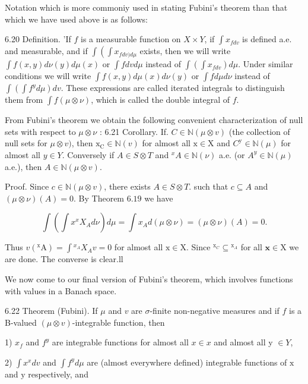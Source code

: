 {{{Notation which is more commoniy used in stating Fubini's theorem than that which we have used above is as follows:

6.20 Definition. 'If $f$ is a measurable function on $X \times Y$, if $\int x_{f d v}$ is defined a.e. and measurable, and if $\int\left(\int x_{f d v) d \mu}\right.$ exists, then we will write $\int f(x, y) d \nu(y) d \mu(x)$ or $\int f d v d \mu$ instead of $\int\left(\int x_{f d v}\right) d \mu$. Under similar conditions we will write $\int f(x, y) d \mu(x) d \nu(y)$ or $\int f d \mu d \nu$ instead of $\int\left(\int f^{y} d \mu\right) d v$. These expressions are called iterated integrals to distinguish them from $\int f(\mu \otimes \nu)$, which is called the double integral of $f$.

From Fubini's theorem we obtain the following convenient characterization of null sets with respect to $\mu \otimes \nu$ : 6.21 Corollary. If. $C \in \mathbb{N}(\mu \otimes v)$ (the collection of null sets for $\mu \otimes v)$, then $\mathrm{x}_{\mathrm{C}} \in \mathbb{N}(v)$ for almost all $\mathrm{x} \in \mathrm{X}$ and $C^{\mathrm{y}} \in \mathbb{N}(\mu)$ for almost all $y \in Y$. Conversely if $A \in S \otimes T$ and ${ }^{x} A \in \mathbb{N}(\nu)$ a.e. (or $A^{y} \in \mathbb{N}(\mu)$ a.e.), then $A \in \mathbb{N}(\mu \otimes v)$.

Proof. Since $c \in \mathbb{N}(\mu \otimes v)$, there exists $A \in S \otimes T$. such that $c \subseteq A$ and $(\mu \otimes \nu)(A)=0$. By Theorem $6.19$ we have

$$
\int\left(\int x^{x} X_{A} d \nu\right) d \mu=\int x_{A} d(\mu \otimes \nu)=(\mu \otimes \nu)(A)=0 .
$$

Thus $v\left({ }^{\mathrm{x}} \mathrm{A}\right)=\int{ }^{x_{A}} X_{A} v=0$ for almost all $\mathrm{x} \in \mathrm{X}$. Since ${ }^{\mathrm{x}_{C}} \subseteq{ }^{\mathrm{x}_{A}}$ for all $\mathbf{x} \in \mathrm{X}$ we are done. The converse is clear.ll

We now come to our final version of Fubini's theorem, which involves functions with values in a Banach space.

6.22 Theorem (Fubini). If $\mu$ and $v$ are $\sigma$-finite non-negative measures and if $f$ is a B-valued $(\mu \otimes v)$-integrable function, then

1) $x_{f}$ and $f^{y}$ are integrable functions for almost all $x \in x$ and almost all y $\in Y$,

2) $\int x^{x} d v$ and $\int f^{y} d \mu$ are (almost everywhere defined) integrable functions of $\mathrm{x}$ and $\mathrm{y}$ respectively, and

}}}
